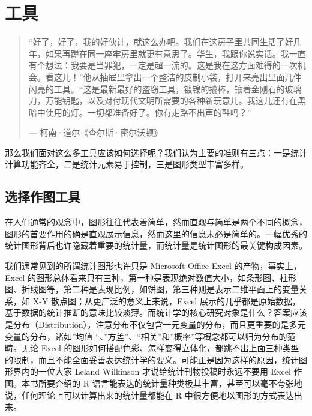 \documentclass[
  b5paper,
  UTF8,twoside]{book}
\begin{document}
\hypertarget{cha:tools}{%
\chapter{工具}\label{cha:tools}}

\begin{quote}
``好了，好了，我的好伙计，就这么办吧。我们在这房子里共同生活了好几年，如果再蹲在同一座牢房里就更有意思了。华生，我跟你说实话。我一直有个想法：我要是当罪犯，一定是超一流的。这是我在这方面难得的一次机会。看这儿！''他从抽屉里拿出一个整洁的皮制小袋，打开来亮出里面几件闪亮的工具。``这是最新最好的盗窃工具，镀镍的撬棒，镶着金刚石的玻璃刀，万能钥匙，以及对付现代文明所需要的各种新玩意儿。我这儿还有在黑暗中使用的灯。一切都准备好了。你有走路不出声的鞋吗？''

\hspace*{\fill} --- 柯南·道尔《查尔斯·密尔沃顿》
\end{quote}

那么我们面对这么多工具应该如何选择呢？我们认为主要的准则有三点：一是统计计算功能齐全，二是统计元素易于控制，三是图形类型丰富多样。

\hypertarget{ux9009ux62e9ux4f5cux56feux5de5ux5177}{%
\section{选择作图工具}\label{ux9009ux62e9ux4f5cux56feux5de5ux5177}}

在人们通常的观念中，图形往往代表着简单，然而直观与简单是两个不同的概念，图形的首要作用的确是直观展示信息，然而这里的信息未必是简单的。一幅优秀的统计图形背后也许隐藏着重要的统计量，而统计量是统计图形的最关键构成因素。

我们通常见到的所谓统计图形也许只是 Microsoft Office Excel 的产物，事实上，Excel 的图形总体看来只有三种，第一种是表现绝对数值大小，如条形图、柱形图、折线图等，第二种是表现比例，如饼图，第三种则是表示二维平面上的变量关系，如 X-Y 散点图；从更广泛的意义上来说，Excel 展示的几乎都是原始数据，基于数据的统计推断的意味比较淡薄。而统计学的核心研究对象是什么？答案应该是分布（Distribution），注意分布不仅包含一元变量的分布，而且更重要的是多元变量的分布，诸如''均值 ``、''方差''、``相关''和''概率''等概念都可以归为分布的范畴。无论 Excel 的图形如何搭配色彩、怎样变得立体化，都跳不出上面三种类型的限制，而且不能全面妥善表达统计学的要义。可能正是因为这样的原因，统计图形界内的一位大家 Leland Wilkinson 才说给统计刊物投稿时永远不要用 Excel 作图。本书所要介绍的 R 语言能表达的统计量种类极其丰富，甚至可以毫不夸张地说，任何理论上可以计算出来的统计量都能在 R 中很方便地以图形的方式表达出来。
\end{document}
